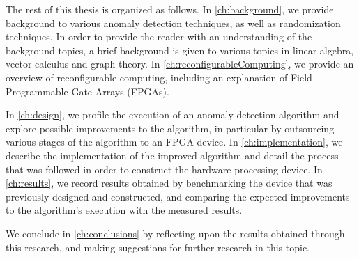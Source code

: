The rest of this thesis is organized as follows. In \autoref{ch:background}, we 
provide background to various anomaly detection techniques, as well as 
randomization techniques. In order to provide the reader with an understanding 
of the background topics, a brief background is given to various topics in 
linear algebra, vector calculus and graph theory. In 
\autoref{ch:reconfigurableComputing}, we provide an overview of reconfigurable 
computing, including an explanation of Field-Programmable Gate Arrays (FPGAs).

In \autoref{ch:design}, we profile the execution of an anomaly detection 
algorithm and explore possible improvements to the algorithm, in particular by 
outsourcing various stages of the algorithm to an FPGA device. In 
\autoref{ch:implementation}, we describe the implementation of the improved 
algorithm and detail the process that was followed in order to construct the 
hardware processing device. In \autoref{ch:results}, we record results obtained
by benchmarking the device that was previously designed and constructed, and 
comparing the expected improvements to the algorithm's execution with the 
measured results.

We conclude in \autoref{ch:conclusions} by reflecting upon the results obtained 
through this research, and making suggestions for further research in this 
topic.
